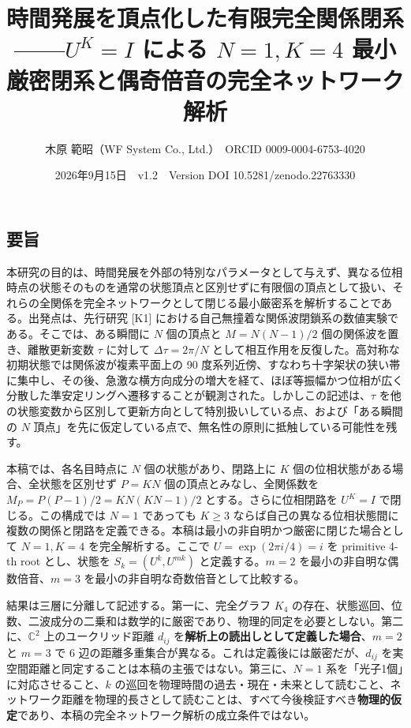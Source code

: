 \documentclass[
  a4paper,
]{ltjsarticle}
\title{時間発展を頂点化した有限完全関係閉系------\(U^K=I\) による
\(N=1, K=4\) 最小厳密閉系と偶奇倍音の完全ネットワーク解析}
\author{木原 範昭（WF System Co., Ltd.）　ORCID 0009-0004-6753-4020}
\date{2026年9月15日　v1.2　Version DOI 10.5281/zenodo.22763330}
\begin{document}
\maketitle

\subsection{要旨}\label{ux8981ux65e8}

本研究の目的は、時間発展を外部の特別なパラメータとして与えず、異なる位相時点の状態そのものを通常の状態頂点と区別せずに有限個の頂点として扱い、それらの全関係を完全ネットワークとして閉じる最小厳密系を解析することである。出発点は、先行研究
{[}K1{]}
における自己無撞着な関係波閉鎖系の数値実験である。そこでは、ある瞬間に
\(N\) 個の頂点と \(M=N(N-1)/2\) 個の関係波を置き、離散更新変数 \(\tau\)
に対して \(\Delta\tau=2\pi/N\)
として相互作用を反復した。高対称な初期状態では関係波が複素平面上の 90
度系列近傍、すなわち十字架状の狭い帯に集中し、その後、急激な横方向成分の増大を経て、ほぼ等振幅かつ位相が広く分散した準安定リングへ遷移することが観測された。しかしこの記述は、\(\tau\)
を他の状態変数から区別して更新方向として特別扱いしている点、および「ある瞬間の
\(N\)
頂点」を先に仮定している点で、無名性の原則に抵触している可能性を残す。

本稿では、各名目時点に \(N\) 個の状態があり、閉路上に \(K\)
個の位相状態がある場合、全状態を区別せず \(P=KN\)
個の頂点とみなし、全関係数を \(M_P=P(P-1)/2=KN(KN-1)/2\)
とする。さらに位相閉路を \(U^K=I\) で閉じる。この構成では \(N=1\)
であっても \(K\ge 3\)
ならば自己の異なる位相状態間に複数の関係と閉路を定義できる。本稿は最小の非自明かつ厳密に閉じた場合として
\(N=1, K=4\) を完全解析する。ここで \(U=\exp(2\pi i/4)=i\) を primitive
4-th root とし、状態を \(S_k=(U^k,U^{mk})\) と定義する。\(m=2\)
を最小の非自明な偶数倍音、\(m=3\)
を最小の非自明な奇数倍音として比較する。

結果は三層に分離して記述する。第一に、完全グラフ \(K_4\)
の存在、状態巡回、位数、二波成分の二乗和は数学的に厳密であり、物理的同定を必要としない。第二に、\(\mathbb C^2\)
上のユークリッド距離 \(d_{ij}\)
を\textbf{解析上の読出しとして定義した場合}、\(m=2\) と \(m=3\) で 6
辺の距離多重集合が異なる。これは定義後には厳密だが、\(d_{ij}\)
を実空間距離と同定することは本稿の主張ではない。第三に、\(N=1\)
系を「光子1個」に対応させること、\(k\)
の巡回を物理時間の過去・現在・未来として読むこと、ネットワーク距離を物理的長さとして読むことは、すべて今後検証すべき\textbf{物理的仮定}であり、本稿の完全ネットワーク解析の成立条件ではない。
\end{document}
